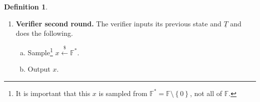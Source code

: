 \documentclass{article}
\theoremstyle{definition}
\newtheorem{definition}[theorem]{Definition}
\newcommand{\samp}{\mathrel{\overset{\$}{\leftarrow}}}
\newcommand{\FF}{\mathbb{F}}
\newcommand{\yq}{\widetilde{\underline{y}}}
\begin{document}
\begin{definition}
\begin{enumerate}
\begin{enumerate}[(a)]
\begin{table}[h!]
\begin{tabular}{|c|c|c|c|}
    & $j_{n_c}$
    & $\underline{c}_{n_c-1, L}$ 
    & $\yq \circ \underline{c}_{n_c-1, R}$ \\
\hline
$\cdots$ 
    & $\cdots$ 
    & $\cdots$ 
    & $\cdots$ \\
\hline
$n^\prime-1$ 
    & $j_1$
    & $\underline{c}_{0, L}$ 
    & $\yq \circ \underline{c}_{0, R}$ \\
\hline
$n^\prime$ 
    & $i_O$
    & $\underline{a}_O$ 
    & $\underline{0}$ \\
\hline
$n^\prime+1$
    & $i_S$
    & $\underline{s}_L$ 
    & $\yq \circ \underline{s}_R$ \\
\hline
\end{tabular}
\caption{The construction of the $\underline{\ell}$ and $\underline{r}$ polynomials. Note that the first $\frac{n^\prime}{2}$ entries of $\underline{\ell}$ are $\underline{0}$. This way, $t(X)$ has no small coefficients, allowing reduced communication complexity in sending $\underline{T}$ in optimized implementations. We recapitulate the indices from Table \ref{table:indices} for convenience.}
\label{tab:lr}
\end{table}

    
	\item Set the following vectors of polynomials.
	\begin{align*}
    \underline{\ell}(X) =& \sum_{i \in [n^\prime + 2]}\underline{\ell}_i X^i  = \sum_{i=\frac{n^\prime}{2}}^{n^\prime + 1}\underline{\ell}_i X^i & \underline{r}(X) =& \sum_{i \in [n^\prime + 2]} \underline{r}_i X^i
    \end{align*}
	\item Compute $$t(X) = \underline{\ell}(X)^\top\underline{r}(X) = \sum_{i=\frac{n^\prime}{2}}^{2(n^\prime + 1)} t_i X^i \in \FF[X]$$
	\item Sample $\tau_i \samp \FF$ for each $i = \frac{n^\prime}{2}, \frac{n^\prime}{2} + 1, \cdots, 2(n^\prime + 1)$ such that $i \neq n^\prime$ and compute the following.
    $$T_i = t_i G + \tau_i H$$
	\item Set $\underline{T} = \left\{T_i\right\}_{i=\frac{n^\prime}{2}, i \neq n^\prime}^{2(n^\prime+1)}$ and output $\underline{T}$.
\end{enumerate}

\item \textbf{Verifier second round.} The verifier inputs its previous state and $\underline{T}$ and does the following.
\begin{enumerate}[(a)]
\item Sample\footnote{It is important that this $x$ is sampled from $\FF^* = \FF \setminus \left\{0\right\}$, not all of $\FF$.} $x \samp \FF^*$.
\item Output $x$.
\end{enumerate}


\end{enumerate}
\end{definition}
\end{document}
